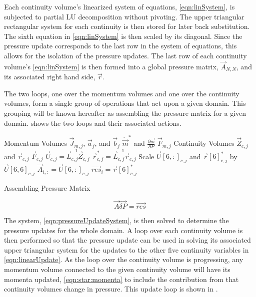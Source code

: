 Each continuity volume's linearized system of equations, \eqref{eqn:linSystem}, is subjected to partial LU decomposition without pivoting.
The upper triangular rectangular system for each continuity is then stored for later back substitution.
The sixth equation in \eqref{eqn:linSystem} is then scaled by its diagonal.
Since the pressure update corresponds to the last row in the system of equations, this allows for the isolation of the pressure updates.
The last row of each continuity volume's \eqref{eqn:linSystem} is then formed into a global pressure matrix, $\vec{A}_{N,N}$, and its associated right hand side, $\vec{r}$.

The two loops, one over the momentum volumes and one over the continuity volumes, form a single group of operations that act upon a given domain.
This grouping will be known hereafter as assembling the pressure matrix for a given domain.
 shows the two loops and their associated actions.

\begin{algo}[H]
\setlength{\baselineskip}{0.625\baselineskip}
\begin{algorithmic}[1]
\Loop \; Momentum Volumes
	\Calculate $\vec{J}_{m, j}$, $\vec{a}_{j}$, and $\vec{b}_{j}$
	\Calculate $\dot{\vec{m}}^{*}$ and $\frac{\partial \dot{\vec{m}}}{\partial P}$
	\Calculate $\vec{F}_{m, j}$	
\EndLoop
\Loop \; Continuity Volumes
   	\Calculate $\vec{Z}_{c,j}$ and $\vec{r}_{c, j}$
 	\Calculate $\vec{F}_{c, j}$	
   	\Calculate $\vec{U}_{c, j} = \vec{L}_{c, j}^{-1} \vec{Z}_{c, j}$
   	\Calculate $\vec{r}^{*}_{c, j} = \vec{L}_{c, j}^{-1} \vec{r}_{c, j}$
   	\Set Scale $\vec{U}[6, :]_{c, j}$ and $\vec{r}[6]^{*}_{c, j}$ by $\vec{U}[6,6]_{c, j}$
   	\Set $\vec{A}_{i, :} = \vec{U}[6,:]_{c, j}$
   	\Set $\vec{res}_{i} = \vec{r}[6]^{*}_{c, j}$
\EndLoop
\end{algorithmic}
\caption{Assembling Pressure Matrix}
\label{alg:xschem}
\end{algo}

\begin{equation}
\label{eqn:pressureUpdateSystem}
\vec{A} \vec{\delta P} = \vec{res}
\end{equation}

The system, \eqref{eqn:pressureUpdateSystem}, is then solved to determine the pressure updates for the whole domain.
A loop over each continuity volume is then performed so that the pressure update can be used in solving its associated upper triangular system for the updates to the other five continuity variables in \eqref{eqn:linearUpdate}.
As the loop over the continuity volume is progressing, any momentum volume connected to the given continuity volume will have its momenta updated, \eqref{eqn:star:momenta} to include the contribution from that continuity volumes change in pressure. 
This update loop is shown in .

